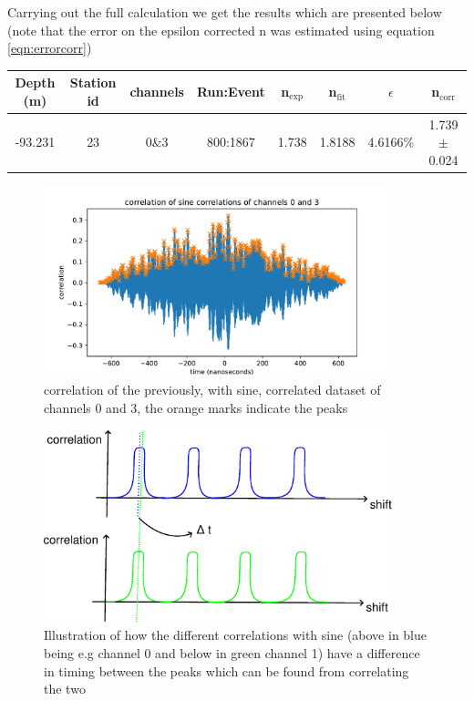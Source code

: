 \documentclass[11pt,a4paper,faculty=we,language=en,doctype=report]{cls/ugent-doc}
\begin{document}
Carrying out the full calculation we get the results which are presented below
(note that the error on the epsilon corrected n was estimated using equation \ref{eqn:errorcorr})
\begin{center}
\begin{tabular}{||c c c c c c c c||}
 \hline
 Depth (m) & Station id & channels & Run:Event & n$_\text{exp}$ & n$_\text{fit}$ & $\epsilon$ & n$_\text{corr}$\\ [0.5ex]
 \hline\hline
 -93.231 & 23 & 0\&3 & 800:1867 & 1.738 & 1.8188 & 4.6166\% & 1.739 $\pm$ 0.024 \\
 \hline
\end{tabular}
\end{center}
\begin{figure}
	\centering
	\includegraphics[width=0.9\textwidth]{figures/crosscorrelation.pdf}
	\caption{correlation of the previously, with sine, correlated dataset
	of channels 0 and 3, the orange marks indicate the peaks}
	\label{fig:CrossCorr}
\end{figure}
\begin{figure}
	\centering
	\includegraphics[width=0.9\textwidth]{figures/IlluCorr.pdf}
	\caption{Illustration of how the different correlations with sine (above
	in blue being e.g channel 0 and below in green channel 1) have a difference
in timing between the peaks which can be found from correlating the two}
	\label{fig:CorrIllu}
\end{figure}
\end{document}
